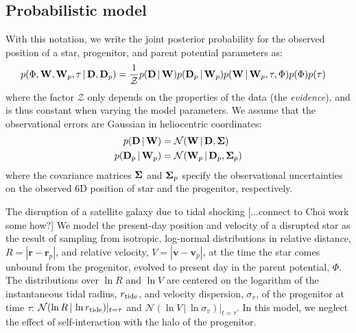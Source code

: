 \documentclass[letterpaper,12pt,preprint]{aastex}
\newcommand{\given}{\,|\,}
\newcommand{\D}{{\bf D}}
\newcommand{\W}{{\bf W}}
\newcommand{\bSigma}{{\bf \Sigma}}
\newcommand{\rtide}{r_{\rm tide}}
\newcommand{\bsr}{\boldsymbol r}
\newcommand{\bsv}{\boldsymbol v}
\begin{document}

\subsection{Probabilistic model}
With this notation, we write the joint posterior probability for the observed position of a star, progenitor, and parent potential parameters as:
\begin{align}
	p(\Phi, \W, \W_p, \tau \given \D, \D_p) &= \frac{1}{\mathcal{Z}} p(\D \given \W) p(\D_p \given \W_p) 
												       p(\W \given \W_p, \tau, \Phi) 
												       p(\Phi) p(\tau)
\end{align}
where the factor $\mathcal{Z}$ only depends on the properties of the data (the \emph{evidence}), and is thus constant when varying the model parameters. We assume that the observational errors are Gaussian in heliocentric coordinates:
\begin{align}
	p(\D \given \W) &= \mathcal{N}(\W \given \D, \bSigma)\\
	p(\D_p \given \W_p) &= \mathcal{N}(\W_p \given \D_p, \bSigma_p)
\end{align}
where the covariance matrices $\bSigma$ and $\bSigma_p$ specify the observational uncertainties on the observed 6D position of star and the progenitor, respectively. 

The disruption of a satellite galaxy due to tidal shocking [...connect to Choi work some how?] We model the present-day position and velocity of a disrupted star as the result of sampling from isotropic, log-normal distributions in relative distance, $R=\left\vert \bsr-\bsr_p \right\vert$, and relative velocity, $V=\left\vert \bsv-\bsv_p \right\vert$, at the time the star comes unbound from the progenitor, evolved to present day in the parent potential, $\Phi$. The distributions over $\ln R$ and $\ln V$ are centered on the logarithm of the instantaneous tidal radius, $\rtide$, and velocity dispersion, $\sigma_v$, of the progenitor at time $\tau$: $\mathcal{N}(\ln R \given \ln\rtide)\vert_{t=\tau}$ and $\mathcal{N}(\ln V \given \ln \sigma_v)\vert_{t=\tau}$. In this model, we neglect the effect of self-interaction with the halo of the progenitor. 
\end{document}
